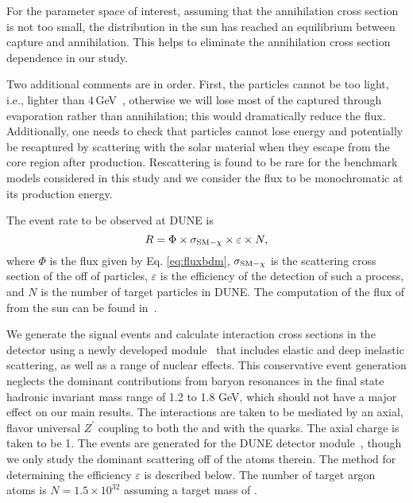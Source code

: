 For the parameter space of interest, %
assuming that the 
 annihilation cross section is not too small, the  distribution in the sun has reached an equilibrium between capture and annihilation. This helps to eliminate the annihilation cross section dependence in our study.

Two additional comments are in order. First, the  particles cannot be too light, i.e.,  lighter than 4\,GeV~\cite{Griest:1986yu,Gould:1987ju}, otherwise we will lose most of the captured  through evaporation rather than annihilation; this would dramatically reduce the  flux. Additionally, one needs to check that  particles cannot lose energy and potentially be recaptured by scattering with the solar material when they escape from the core region after production. Rescattering is found to be rare for the benchmark models considered in this study and we consider the  flux to be monochromatic at its production energy.

The event rate to be observed at DUNE is 
\begin{equation}
R = \Phi \times \sigma_{\rm{SM} - \chi} \times \varepsilon \times N,
\end{equation}
 where $\Phi$ is the flux given by Eq. \eqref{eq:fluxbdm}, $\sigma_{\rm{SM} - \chi}$ is the scattering cross section of the  off of  particles, $\varepsilon$ is the efficiency of the detection of such a process, and $N$ is the number of target particles in DUNE. The computation of the flux of  from the sun can be found in~\cite{Berger:2014sqa}. 
 
We generate the signal events and calculate interaction cross sections in the detector using a newly developed  module~\cite{Andreopoulos:2009rq,Andreopoulos:2015wxa,Berger:2018} that includes elastic and deep inelastic scattering, as well as a range of nuclear effects. This conservative event generation neglects the dominant contributions from baryon resonances in the final state hadronic invariant mass range of 1.2 to 1.8 GeV, which should not have a major effect on our main results. The interactions are taken to be mediated by an axial, flavor universal 
$Z^\prime$ coupling to both the  and with the quarks. The axial charge is taken to be 1. 
The events are generated for the \nominalmodsize DUNE detector module~\cite{dunetpc_code}, though we only study the dominant scattering off of the  atoms therein. The method for determining the efficiency $\varepsilon$ is described below. The number of target argon atoms is $N = 1.5  \times 10^{32}$ assuming a target mass of \nominalmodsize{}.

